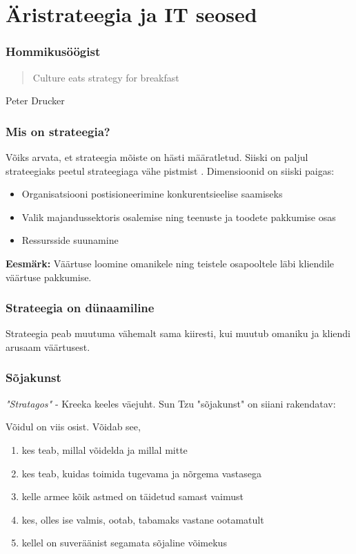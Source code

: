 \section{Äristrateegia ja IT seosed}

\begin{frame}[fragile]
  \frametitle{Hommikusöögist}
  \begin{quote}
    Culture eats strategy for breakfast
  \end{quote}
	Peter Drucker
\end{frame}


\begin{frame}[fragile]
  \frametitle{Mis on strateegia?}
  	Võiks arvata, et strateegia mõiste on hästi määratletud. Siiski on paljul strateegiaks peetul strateegiaga vähe pistmist \citep{de2006strategy}. Dimensioonid on siiski paigas:
	\begin{itemize}
		\item Organisatsiooni postisioneerimine konkurentsieelise saamiseks
		\item Valik majandussektoris osalemise ning teenuste ja toodete pakkumise osas
		\item Ressursside suunamine 
	\end{itemize}
	\textbf{Eesmärk:} Väärtuse loomine omanikele ning teistele osapooltele läbi kliendile väärtuse pakkumise.
\end{frame}

\begin{frame}[fragile]
  \frametitle{Strateegia on dünaamiline}
	\vfill
	\begin{center}
		Strateegia peab muutuma vähemalt sama kiiresti, kui muutub omaniku ja kliendi arusaam väärtusest.
	\end{center}
	\vfill
\end{frame}


\begin{frame}[fragile]
  \frametitle{Sõjakunst}
  \emph{"Stratagos"} - Kreeka keeles väejuht. Sun Tzu "sõjakunst" \citep{tzu2013art} on siiani rakendatav:
  
  Võidul on viis osist. Võidab see, 
   \begin{enumerate}
   		\item kes teab, millal võidelda ja millal mitte
		\item kes teab, kuidas toimida tugevama ja nõrgema vastasega
		\item kelle armee kõik astmed on täidetud samast vaimust
		\item kes, olles ise valmis, ootab, tabamaks vastane ootamatult
		\item kellel on suveräänist segamata sõjaline võimekus
   \end{enumerate}
\end{frame}

